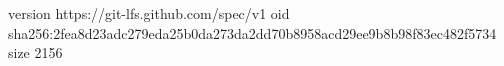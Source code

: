version https://git-lfs.github.com/spec/v1
oid sha256:2fea8d23adc279eda25b0da273da2dd70b8958acd29ee9b8b98f83ec482f5734
size 2156
